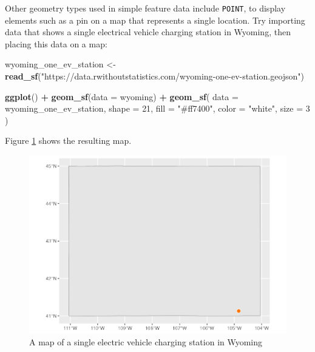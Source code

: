 \documentclass[
]{book}
\newenvironment{Shaded}{\begin{snugshade}}{\end{snugshade}}
\newcommand{\AttributeTok}[1]{\textcolor[rgb]{0.13,0.29,0.53}{#1}}
\newcommand{\DecValTok}[1]{\textcolor[rgb]{0.00,0.00,0.81}{#1}}
\newcommand{\FunctionTok}[1]{\textcolor[rgb]{0.13,0.29,0.53}{\textbf{#1}}}
\newcommand{\NormalTok}[1]{#1}
\newcommand{\OtherTok}[1]{\textcolor[rgb]{0.56,0.35,0.01}{#1}}
\newcommand{\SpecialCharTok}[1]{\textcolor[rgb]{0.81,0.36,0.00}{\textbf{#1}}}
\newcommand{\StringTok}[1]{\textcolor[rgb]{0.31,0.60,0.02}{#1}}
\begin{document}
Other geometry types used in simple feature data include \texttt{POINT}, to display elements such as a pin on a map that represents a single location. Try importing data that shows a single electrical vehicle charging station in Wyoming, then placing this data on a map:

\begin{Shaded}
\begin{Highlighting}[]
\NormalTok{wyoming\_one\_ev\_station }\OtherTok{\textless{}{-}} \FunctionTok{read\_sf}\NormalTok{(}\StringTok{"https://data.rwithoutstatistics.com/wyoming{-}one{-}ev{-}station.geojson"}\NormalTok{)}

\FunctionTok{ggplot}\NormalTok{() }\SpecialCharTok{+}
  \FunctionTok{geom\_sf}\NormalTok{(}\AttributeTok{data =}\NormalTok{ wyoming) }\SpecialCharTok{+}
  \FunctionTok{geom\_sf}\NormalTok{(}
    \AttributeTok{data =}\NormalTok{ wyoming\_one\_ev\_station,}
    \AttributeTok{shape =} \DecValTok{21}\NormalTok{,}
    \AttributeTok{fill =} \StringTok{"\#ff7400"}\NormalTok{,}
    \AttributeTok{color =} \StringTok{"white"}\NormalTok{,}
    \AttributeTok{size =} \DecValTok{3}
\NormalTok{  )}
\end{Highlighting}
\end{Shaded}

Figure \ref{fig:ev-stations-map} shows the resulting map.

\begin{figure}
\includegraphics[width=1\linewidth]{maps_files/figure-latex/ev-stations-map-1} \caption{A map of a single electric vehicle charging station in Wyoming}\label{fig:ev-stations-map}
\end{figure}
\end{document}
